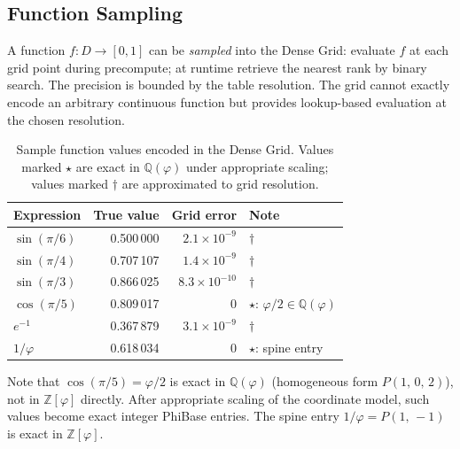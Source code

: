 \documentclass[12pt]{article}
\theoremstyle{definition}
\theoremstyle{remark}
\newcommand{\Zphi}{\mathbb{Z}[\varphi]}
\newcommand{\Qphi}{\mathbb{Q}(\varphi)}
\newcommand{\Phib}[2]{P(#1,\,#2)}
\newcommand{\Phibd}[3]{P(#1,\,#2,\,#3)}
\begin{document}
\subsection{Function Sampling}
A function $f:D\to[0,1]$ can be \emph{sampled} into the Dense Grid:
evaluate $f$ at each grid point during precompute; at runtime retrieve
the nearest rank by binary search.  The precision is bounded by the
table resolution.  The grid cannot exactly encode an arbitrary
continuous function but provides lookup-based evaluation at the chosen
resolution.
\begin{table}[h]
\centering
\caption{Sample function values encoded in the Dense Grid.
  Values marked $\star$ are exact in $\Qphi$ under appropriate scaling;
  values marked $\dagger$ are approximated to grid resolution.}
\label{tab:funclookup}
\begin{tabular}{lrrl}
\toprule
Expression & True value & Grid error & Note \\
\midrule
$\sin(\pi/6)$   & 0.500\,000 & $2.1\times10^{-9}$ & $\dagger$ \\
$\sin(\pi/4)$   & 0.707\,107 & $1.4\times10^{-9}$ & $\dagger$ \\
$\sin(\pi/3)$   & 0.866\,025 & $8.3\times10^{-10}$& $\dagger$ \\
$\cos(\pi/5)$   & 0.809\,017 & $0$ & $\star$: $\varphi/2\in\Qphi$ \\
$e^{-1}$        & 0.367\,879 & $3.1\times10^{-9}$ & $\dagger$ \\
$1/\varphi$     & 0.618\,034 & $0$ & $\star$: spine entry \\
\bottomrule
\end{tabular}
\end{table}
Note that $\cos(\pi/5)=\varphi/2$ is exact in $\Qphi$ (homogeneous
form $\Phibd{1}{0}{2}$), not in $\Zphi$ directly.  After appropriate
scaling of the coordinate model, such values become exact integer
PhiBase entries.  The spine entry $1/\varphi = \Phib{1}{-1}$ is
exact in $\Zphi$.
\end{document}
